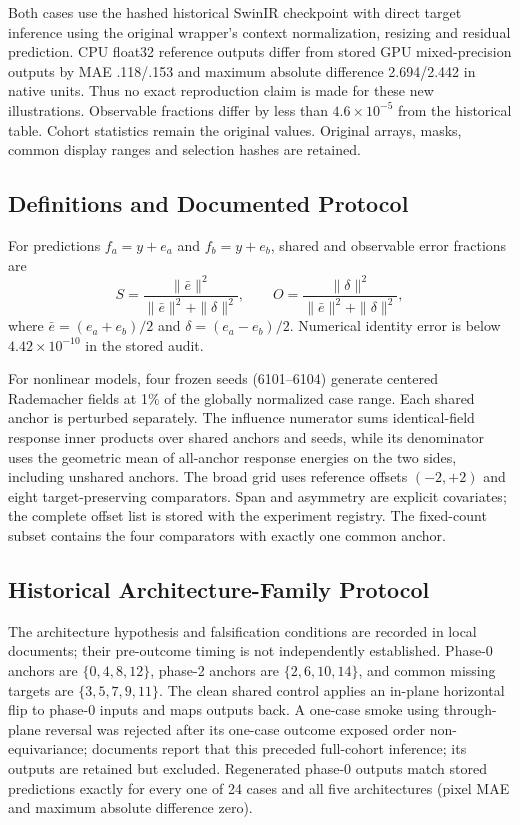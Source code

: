 Both cases use the hashed historical SwinIR checkpoint with direct target inference using the original wrapper's context normalization, resizing and residual prediction. CPU float32 reference outputs differ from stored GPU mixed-precision outputs by MAE .118/.153 and maximum absolute difference 2.694/2.442 in native units. Thus no exact reproduction claim is made for these new illustrations. Observable fractions differ by less than $4.6\times10^{-5}$ from the historical table. Cohort statistics remain the original values. Original arrays, masks, common display ranges and selection hashes are retained.

\subsection{Definitions and Documented Protocol}
For predictions $f_a=y+e_a$ and $f_b=y+e_b$, shared and observable error fractions are
\begin{equation}
S=\frac{\|\bar e\|^2}{\|\bar e\|^2+\|\delta\|^2},\qquad
O=\frac{\|\delta\|^2}{\|\bar e\|^2+\|\delta\|^2},
\end{equation}
where $\bar e=(e_a+e_b)/2$ and $\delta=(e_a-e_b)/2$. Numerical identity error is below $4.42\times10^{-10}$ in the stored audit.

For nonlinear models, four frozen seeds (6101--6104) generate centered Rademacher fields at 1\% of the globally normalized case range. Each shared anchor is perturbed separately. The influence numerator sums identical-field response inner products over shared anchors and seeds, while its denominator uses the geometric mean of all-anchor response energies on the two sides, including unshared anchors. The broad grid uses reference offsets $(-2,+2)$ and eight target-preserving comparators. Span and asymmetry are explicit covariates; the complete offset list is stored with the experiment registry. The fixed-count subset contains the four comparators with exactly one common anchor.

\subsection{Historical Architecture-Family Protocol}
The architecture hypothesis and falsification conditions are recorded in local documents; their pre-outcome timing is not independently established. Phase-0 anchors are $\{0,4,8,12\}$, phase-2 anchors are $\{2,6,10,14\}$, and common missing targets are $\{3,5,7,9,11\}$. The clean shared control applies an in-plane horizontal flip to phase-0 inputs and maps outputs back. A one-case smoke using through-plane reversal was rejected after its one-case outcome exposed order non-equivariance; documents report that this preceded full-cohort inference; its outputs are retained but excluded. Regenerated phase-0 outputs match stored predictions exactly for every one of 24 cases and all five architectures (pixel MAE and maximum absolute difference zero).

